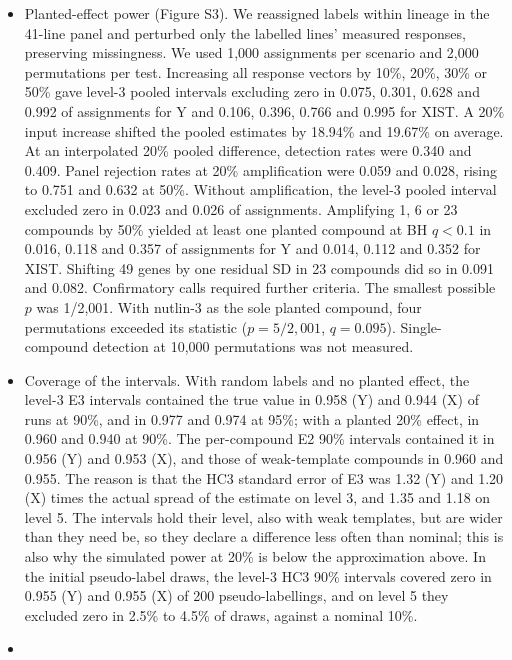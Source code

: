 \documentclass[
  11pt,
  letterpaper,
]{article}
\begin{document}
\begin{itemize}
  0.11 (Y) and 0.11 (X). Doubling one compound's response size gave 0.41
  (Y) and 0.42 (X).
\item
  Planted-effect power (Figure S3). We reassigned labels within lineage
  in the 41-line panel and perturbed only the labelled lines' measured
  responses, preserving missingness. We used 1,000 assignments per
  scenario and 2,000 permutations per test. Increasing all response vectors
  by 10\%, 20\%, 30\% or 50\% gave level-3 pooled intervals excluding zero
  in 0.075, 0.301, 0.628 and 0.992 of assignments for Y and 0.106, 0.396,
  0.766 and 0.995 for XIST. A 20\% input increase shifted the pooled
  estimates by 18.94\% and 19.67\% on average. At an interpolated 20\%
  pooled difference, detection rates were 0.340 and 0.409. Panel rejection
  rates at 20\% amplification were 0.059 and 0.028, rising to 0.751 and
  0.632 at 50\%. Without amplification, the level-3 pooled interval excluded
  zero in 0.023 and 0.026 of assignments. Amplifying 1, 6 or 23 compounds
  by 50\% yielded at least one planted compound at BH $q<0.1$ in 0.016,
  0.118 and 0.357 of assignments for Y and 0.014, 0.112 and 0.352 for XIST.
  Shifting 49 genes by one residual SD in 23 compounds did so in 0.091
  and 0.082. Confirmatory calls required further criteria. The smallest
  possible $p$ was 1/2,001. With nutlin-3 as the sole planted compound,
  four permutations exceeded its statistic ($p=5/2{,}001$, $q=0.095$).
  Single-compound detection at 10,000 permutations was not measured.
\item
  Coverage of the intervals. With random labels and no planted effect,
  the level-3 E3 intervals contained the true value in 0.958 (Y) and
  0.944 (X) of runs at 90\%, and in 0.977 and 0.974 at 95\%; with a
  planted 20\% effect, in 0.960 and 0.940 at 90\%. The per-compound E2
  90\% intervals contained it in 0.956 (Y) and 0.953 (X), and those of
  weak-template compounds in 0.960 and 0.955. The reason is that the HC3
  standard error of E3 was 1.32 (Y) and 1.20 (X) times the actual spread
  of the estimate on level 3, and 1.35 and 1.18 on level 5. The
  intervals hold their level, also with weak templates, but are wider
  than they need be, so they declare a difference less often than
  nominal; this is also why the simulated power at 20\% is below the
  approximation above. In the initial pseudo-label draws, the level-3
  HC3 90\% intervals covered zero in 0.955 (Y) and 0.955 (X) of 200
  pseudo-labellings, and on level 5 they excluded zero in 2.5\% to 4.5\%
  of draws, against a nominal 10\%.
\item

\end{itemize}
\end{document}
